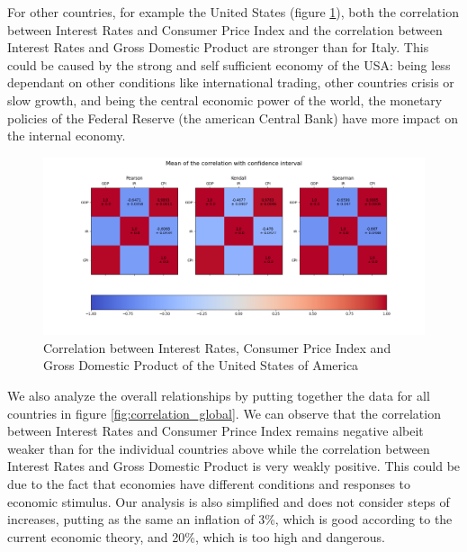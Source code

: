 For other countries, for example the United States (figure \ref{fig:correlation_us}), both the correlation between Interest Rates and Consumer Price Index and the correlation between Interest Rates and Gross Domestic Product are stronger than for Italy. This could be caused by the strong and self sufficient economy of the USA: being less dependant on other conditions like international trading, other countries crisis or slow growth, and being the central economic power of the world, the monetary policies of the Federal Reserve (the american Central Bank) have more impact on the internal economy.

\begin{figure}[H]
    \centering
    \includegraphics[width=\linewidth]{imgs/usa_correlation.png}
    \caption{Correlation between Interest Rates, Consumer Price Index and Gross Domestic Product of the United States of America}
    \label{fig:correlation_us}
\end{figure}

We also analyze the overall relationships by putting together the data for all countries in figure \ref{fig:correlation_global}. We can observe that the correlation between Interest Rates and Consumer Prince Index remains negative albeit weaker than for the individual countries above while the correlation between Interest Rates and Gross Domestic Product is very weakly positive. This could be due to the fact that economies have different conditions and responses to economic stimulus. Our analysis is also simplified and does not consider steps of increases, putting as the same an inflation of 3\%, which is good according to the current economic theory, and 20\%, which is too high and dangerous.

